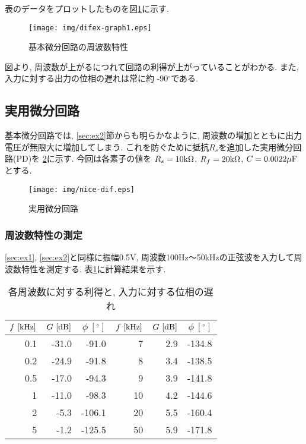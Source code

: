 \documentclass[titlepage]{jsarticle}
\begin{document}
            表のデータをプロットしたものを図\ref{fig:difex1}に示す.

            \begin{figure}[h]
                \centering
                \texttt{[image: img/difex-graph1.eps]}
                \caption{基本微分回路の周波数特性}
                \label{fig:difex1}
            \end{figure}

            図より, 周波数が上がるにつれて回路の利得が上がっていることがわかる.
            また, 入力に対する出力の位相の遅れは常に約 -90$^\circ$である.

    \subsection{実用微分回路}
        基本微分回路では, \ref{sec:ex2}節からも明らかなように,
        周波数の増加とともに出力電圧が無限大に増加してしまう.
        これを防ぐために抵抗$R_s$を追加した実用微分回路(PD)を
        \ref{fig:nice-dif}に示す.
        今回は各素子の値を
        $R_s = 10\rm{k\Omega}$, $R_f = 20\rm{k\Omega}$, $C = 0.0022\rm{\mu F}$とする.

        \begin{figure}[h]
            \centering
            \texttt{[image: img/nice-dif.eps]}
            \caption{実用微分回路}
            \label{fig:nice-dif}
        \end{figure}

        \subsubsection{周波数特性の測定} \label{sec:ex3}
            \ref{sec:ex1}, \ref{sec:ex2}と同様に振幅0.5V,
            周波数100Hz〜50kHzの正弦波を入力して周波数特性を測定する.
            表\ref{tab:nice-dif}に計算結果を示す.

            \begin{table}[h]
                \caption{各周波数に対する利得と, 入力に対する位相の遅れ}
                \label{tab:nice-dif}
                \centering
                \begin{tabular}{r|rr||r|rr}
                    $f \ [\rm{kHz}]$ & $G \ [\rm{dB}]$ & $\phi \ [^\circ]$ & $f \ [\rm{kHz}]$ & $G \ [\rm{dB}]$ & $\phi \ [^\circ]$ \\ \hline \hline
                    0.1 & -31.0 & -91.0 & 7 & 2.9 & -134.8 \\
                    0.2 & -24.9 & -91.8 & 8 & 3.4 & -138.5 \\
                    0.5 & -17.0 & -94.3 & 9 & 3.9 & -141.8 \\
                    1 & -11.0 & -98.3 & 10 & 4.2 & -144.6 \\
                    2 & -5.3 & -106.1 & 20 & 5.5 & -160.4 \\
                    5 & -1.2 & -125.5 & 50 & 5.9 & -171.8 \\
                \end{tabular}
            \end{table}
\end{document}
